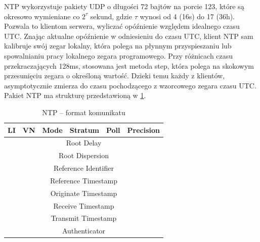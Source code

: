 \documentclass[../main.tex]{subfiles}
\begin{document}
NTP wykorzystuje pakiety UDP o długości 72 bajtów na porcie 123, które są okresowo wymieniane co ${2^\tau}$ sekund, gdzie ${\tau}$ wynosi od 4 (16s) do 17 (36h). 
Pozwala to klientom serwera, wyliczać opóźnienie względem idealnego czasu UTC.
Znając aktualne opóźnienie w odniesieniu do czasu UTC, klient NTP sam kalibruje swój zegar lokalny, która polega na płynnym przyspieszaniu lub spowalnianiu pracy lokalnego zegara programowego.
Przy różnicach czasu przekraczających 128ms, stosowana jest metoda step, która polega na skokowym przesunięciu zegara o określoną wartość.
Dzieki temu każdy z klientów, asymptotycznie zmierza do czasu pochodzącego z wzorcowego zegara czasu UTC.
Pakiet NTP ma strukturę przedstawioną w \ref{tab:ntp}.

\begin{table}[H]
  \centering
  \begin{tabular}{|c|c|c|c|c|c|}
    \hline
    LI & VN & Mode & Stratum & Poll & Precision \\
    \hline
    \multicolumn{6}{|c|}{Root Delay} \\
    \hline
    \multicolumn{6}{|c|}{Root Dispersion} \\
    \hline
    \multicolumn{6}{|c|}{Reference Identifier} \\
    \hline
    \multicolumn{6}{|c|}{Reference Timestamp} \\
    \hline
    \multicolumn{6}{|c|}{Originate Timestamp} \\
    \hline
    \multicolumn{6}{|c|}{Receive Timestamp} \\
    \hline
    \multicolumn{6}{|c|}{Transmit Timestamp} \\
    \hline
    \multicolumn{6}{|c|}{Authenticator} \\
    \hline
  \end{tabular}
  \label{tab:ntp}
  \caption{NTP – format komunikatu \cite{st:serwerczasu-jpg}}

\end{table}
\end{document}
